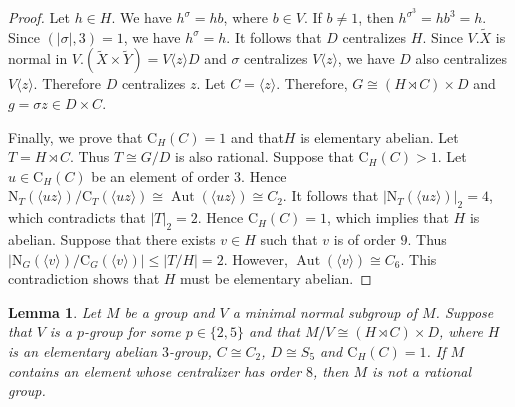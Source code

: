 \documentclass[11pt]{article}
\providecommand{\N}{{\mathrm{N}}}
\providecommand{\C}{{\mathrm{C}}}
\providecommand{\Aut}{{\operatorname{Aut}}}
\providecommand{\gen}[1]{\langle #1 \rangle} %
\providecommand{\gen}[1]{\langle #1 \rangle} %
\providecommand{\gen}[1]{\langle #1 \rangle} %
\providecommand{\wtX}{{\widetilde{X}}}
\providecommand{\wtY}{{\widetilde{Y}}}
\newtheorem{lem}{Lemma}
\begin{document}
\begin{proof}
    Let $h\in H$. We have $h^\sigma = hb$, where $b\in V$.
    If $b\neq 1$, then $h^{\sigma^3}=hb^3=h$.
    Since $(|\sigma|,3)=1$, we have $h^{\sigma}=h$.
    It follows that $D$ centralizes $H$.
    Since $V.\wtX$ is normal in $V.(\wtX\times \wtY)=V\gen{z}D$
    and $\sigma$ centralizes $V\gen{z}$, 
    we have $D$ also centralizes $V\gen{z}$.
    Therefore $D$ centralizes $z$.
    Let $C=\gen{z}$. 
    Therefore, $G \cong (H\rtimes C)\times D$ and $g = \sigma z \in D \times C$.

    Finally, we prove that $\C_H(C)=1$ and that$H$ is elementary abelian.
    Let $T=H\rtimes C$. Thus $T\cong G/D$ is also rational.
    Suppose that $\C_H(C)>1$. Let $u\in \C_H(C)$ be an element of order $3$.
    Hence $\N_T(\gen{uz})/\C_T(\gen{uz})\cong \Aut(\gen{uz})\cong C_2$.
    It follows that $|\N_T(\gen{uz})|_2 = 4$, which contradicts that $|T|_2=2$.
    Hence $\C_H(C)=1$, which implies that $H$ is abelian.
    Suppose that there exists $v\in H$ such that $v$ is of order $9$.
    Thus $|\N_G(\gen{v})/\C_G(\gen{v})|\leq |T/H|=2$.
    However, $\Aut(\gen{v})\cong C_6$.
    This contradiction shows that $H$ must be elementary abelian.
\end{proof}

\begin{lem}
\label{S3S5}
    Let $M$ be a group and $V$ a minimal normal subgroup of $M$.
    Suppose that $V$ is a $p$-group for some $p\in\{2,5\}$ 
    and that $M/V\cong (H\rtimes C)\times D$,
    where $H$ is an elementary abelian $3$-group, $C\cong C_2$, $D\cong S_5$ and $\C_H(C)=1$.
    If $M$ contains an element whose centralizer has order $8$, 
    then $M$ is not a rational group.
\end{lem}
\end{document}
